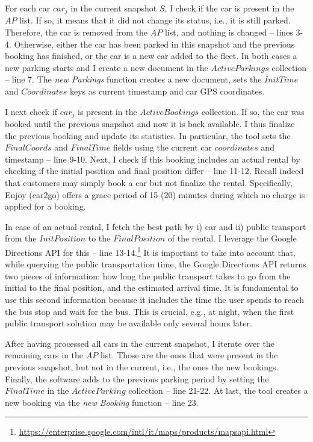 For each car $car_j$ in the current snapshot $S$, I check if the car is present in the $AP$ list. 
If so, it means that it did not change its status, i.e., it is still parked. Therefore, the car is removed from the $AP$ list, and nothing is changed -- lines 3-4.
Otherwise, either the car has been parked in this snapshot and the previous booking has finished, or the car is a new car added to the fleet. In both cases a new parking starts and I create a new document in the $ActiveParkings$ collection -- line 7. The \textit{new Parkings} function creates a new document, sets the $InitTime$ and $Coordinates$ keys as current timestamp and car GPS coordinates.

I next check if $car_j$ is present in the $ActiveBookings$ collection. If so, the car was booked until the previous snapshot and now it is back available. I thus finalize the previous booking and update its statistics. In particular, the tool sets the $FinalCoords$ and $FinalTime$ fields using the current car $coordinates$ and timestamp -- line 9-10. Next, I check if this booking includes an actual rental by checking if the initial position and final position differ -- line 11-12. Recall indeed that customers may simply book a car but not finalize the rental. Specifically, Enjoy (car2go) offers a grace period of 15 (20) minutes during which no charge is applied for a booking.

In case of an actual rental, I fetch the best path by i) car and ii) public transport from the  $InitPosition$ to the $FinalPosition$ of the rental. I leverage the Google Directions API for this -- line 13-14.\footnote{\url{https://enterprise.google.com/intl/it/maps/products/mapsapi.html}}
It is important to take into account that, while querying the public transportation time, the Google Directions API returns two pieces of information: how long the public transport takes to go from the initial to the final position, and the estimated arrival time. It is fundamental to use this second information because  it includes the time the user spends to reach the bus stop and wait for the bus. This is crucial, e.g., at night, when the first public transport solution may be available only several hours later.

After having processed all cars in the current snapshot, I iterate over the remaining cars in the $AP$ list. Those are the ones that were present in the previous snapshot, but not in the current, i.e., the ones the new bookings. Finally, the software adds to the previous parking period by setting the $FinalTime$ in the $ActiveParking$ collection -- line 21-22. At last, the tool creates a new booking via the \textit{new Booking} function -- line 23.


